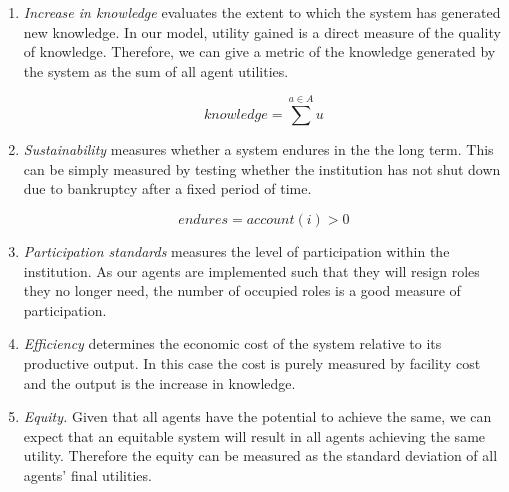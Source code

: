\begin{enumerate}
\item \emph{Increase in knowledge} evaluates the extent to which the system has
generated new knowledge. In our model, utility gained is a direct measure of the
quality of knowledge. Therefore, we can give a metric of the knowledge generated
by the system as the sum of all agent utilities.

\begin{equation}
\mathit{knowledge} = \sum^{a\in A} u
\end{equation}

\item \emph{Sustainability} measures whether a system endures in the the long term.
This can be simply measured by testing whether the institution has not shut down 
due to bankruptcy after a fixed period of time.

\begin{equation}
\mathit{endures} = \mathit{account}(i) > 0
\end{equation}

\item \emph{Participation standards} measures the level of participation within the 
institution. As our agents are implemented such that they will resign roles they 
no longer need, the number of occupied roles is a good measure of participation.

\item \emph{Efficiency} determines the economic cost of the system relative to its productive output. In this case the cost is purely measured by facility cost and the output is the increase in knowledge.

\item \emph{Equity.} Given that all agents have the potential to achieve the same, we can expect that an equitable system will result in all agents achieving the same utility. Therefore the equity can be measured as the standard deviation of all agents' final utilities. 
\end{enumerate}

